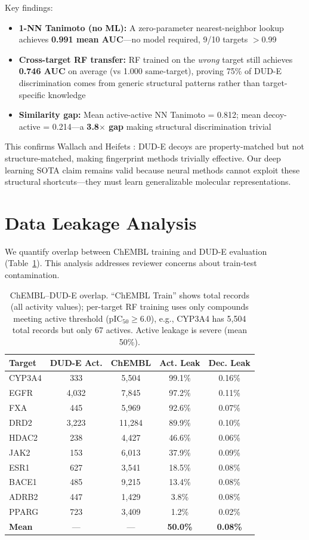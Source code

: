 \documentclass[runningheads]{llncs}
\begin{document}
Key findings:
\begin{itemize}[noitemsep,topsep=0pt]
\item \textbf{1-NN Tanimoto (no ML):} A zero-parameter nearest-neighbor lookup achieves \textbf{0.991 mean AUC}---no model required, 9/10 targets $>$0.99
\item \textbf{Cross-target RF transfer:} RF trained on the \textit{wrong} target still achieves \textbf{0.746 AUC} on average (vs 1.000 same-target), proving 75\% of DUD-E discrimination comes from generic structural patterns rather than target-specific knowledge
\item \textbf{Similarity gap:} Mean active-active NN Tanimoto = 0.812; mean decoy-active = 0.214---a \textbf{3.8$\times$ gap} making structural discrimination trivial
\end{itemize}

This confirms Wallach and Heifets \cite{wallach_2018_dude_bias}: DUD-E decoys are property-matched but not structure-matched, making fingerprint methods trivially effective. Our deep learning SOTA claim remains valid because neural methods cannot exploit these structural shortcuts---they must learn generalizable molecular representations.

\section{Data Leakage Analysis}
\label{app:leakage}

We quantify overlap between ChEMBL training and DUD-E evaluation (Table~\ref{tab:leakage}). This analysis addresses reviewer concerns about train-test contamination.

\begin{table}[t]
\caption{ChEMBL--DUD-E overlap. ``ChEMBL Train'' shows total records (all activity values); per-target RF training uses only compounds meeting active threshold (pIC$_{50} \geq 6.0$), e.g., CYP3A4 has 5,504 total records but only 67 actives. Active leakage is severe (mean 50\%).}
\label{tab:leakage}
\centering
\small
\begin{tabular}{@{}lcccc@{}}
\toprule
Target & DUD-E Act. & ChEMBL & Act. Leak & Dec. Leak \\
\midrule
CYP3A4 & 333 & 5,504 & 99.1\% & 0.16\% \\
EGFR & 4,032 & 7,845 & 97.2\% & 0.11\% \\
FXA & 445 & 5,969 & 92.6\% & 0.07\% \\
DRD2 & 3,223 & 11,284 & 89.9\% & 0.10\% \\
HDAC2 & 238 & 4,427 & 46.6\% & 0.06\% \\
JAK2 & 153 & 6,013 & 37.9\% & 0.09\% \\
ESR1 & 627 & 3,541 & 18.5\% & 0.08\% \\
BACE1 & 485 & 9,215 & 13.4\% & 0.08\% \\
ADRB2 & 447 & 1,429 & 3.8\% & 0.08\% \\
PPARG & 723 & 3,409 & 1.2\% & 0.02\% \\
\midrule
\textbf{Mean} & --- & --- & \textbf{50.0\%} & \textbf{0.08\%} \\
\bottomrule
\end{tabular}
\end{table}
\end{document}

